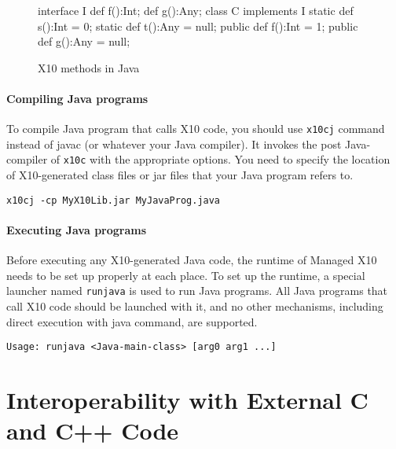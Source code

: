 \begin{figure}
\begin{xten}
interface I {
  def f():Int;
  def g():Any;
}
class C implements I {
  static def s():Int = 0;
  static def t():Any = null;
  public def f():Int = 1;
  public def g():Any = null;
}
\end{xten}
\caption{X10 methods in Java}
\label{fig:methods}
\end{figure}


\paragraph{Compiling Java programs}

To compile Java program that calls X10 code, you should use
\verb|x10cj| command instead of javac (or whatever your Java
compiler). It invokes the post Java-compiler of \verb|x10c| with the
appropriate options. You need to specify the location of X10-generated
class files or jar files that your Java program refers to.

\verb|x10cj -cp MyX10Lib.jar MyJavaProg.java|


\paragraph{Executing Java programs}

Before executing any X10-generated Java code, the runtime of Managed
X10 needs to be set up properly at each place.  To set up the runtime,
a special launcher named \verb|runjava| is used to run Java programs.
All Java programs that call X10 code should be launched with it, and
no other mechanisms, including direct execution with java command, are
supported.

\begin{verbatim}
Usage: runjava <Java-main-class> [arg0 arg1 ...]
\end{verbatim}


\section{Interoperability with External C and C++ Code}


